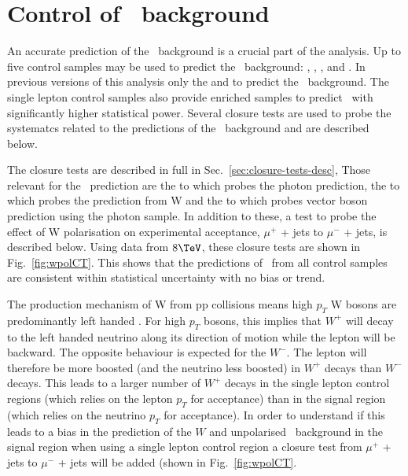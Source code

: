 \clearpage
\section{Control of \zInv\ background \label{app:zInvBgControl}}


An accurate prediction of the \zInv\ background is a crucial part 
of the analysis. Up to five control samples may be used 
to predict the \zInv\ background: \mj, \mmj, \ej, \eej and \gj. 
In previous versions of this analysis only the \zmmj and 
\gj to predict the \zInv\ background. The single
lepton control samples also provide \wj enriched samples to predict
\zInv\ with significantly higher statistical power. 
Several closure tests are used to probe the 
systematcs related to the predictions of the \zInv\ background
and are described below.

The closure tests are described in full in Sec.~\ref{sec:closure-tests-desc},
Those relevant for the \zInv\ prediction are the \mmj to \gj
which probes the photon prediction, the \mj to \mmj which probes the
prediction from W and the \mj to \gj which probes vector boson prediction 
using the photon sample. In addition to these, a test to probe the effect
of W polarisation on experimental acceptance, $\mu^+$ + jets to $\mu^-$ + jets,
is described below. Using data from $8\TeV$, 
these closure tests are shown in Fig.~\ref{fig:wpolCT}.
This shows that the predictions of \zInv\ from
all control samples are consistent within statistical 
uncertainty with no bias or trend. 


The production mechanism of W from pp collisions means
high $p_T$ W bosons are predominantly left handed \cite{WPol}.  
For high $p_T$ bosons, this implies that $W^+$ will decay 
to the left handed neutrino along its direction of motion while 
the lepton will be backward. The opposite behaviour is
expected for the $W^-$. The lepton will therefore be more boosted (and
the neutrino less boosted) in $W^+$ decays than $W^-$ decays.  This
leads to a larger number of $W^+$ decays in the single lepton control
regions (which relies on the lepton $p_T$ for acceptance) than in the
signal region (which relies on the neutrino $p_T$ for acceptance). In
order to understand if this leads to a bias in the prediction of the
$W$ and unpolarised \zInv\ background in the signal region when using
a single lepton control region a closure test from $\mu^+$ + jets to
$\mu^-$ + jets will be added (shown in Fig.~\ref{fig:wpolCT}. 

